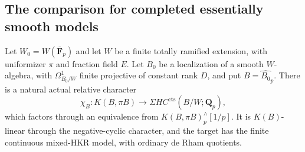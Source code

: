 \subsection{The comparison for completed essentially smooth models}

\begin{lemma}
\label{d3:lem:essentiallysmoothAMMN}
Let $W_0=W(\overline{\mathbf F}_p)$ and let $W$
be a finite totally ramified extension, with uniformizer $\pi$
and fraction field $E$. Let $B_0$ be a localization of a smooth
$W$-algebra, with $\Omega^1_{B_0/W}$ finite projective of constant
rank $D$, and put $B=\widehat{B_0}_p$.
There is a natural actual relative character
\[
 \chi_B:K(B,\pi B)\longrightarrow
                 \Sigma HC^{\mathrm{cts}}(B/W;\mathbf Q_p),
\]
which factors through an equivalence from
$K(B,\pi B)^{\wedge}_p[1/p]$. It is $K(B)$-linear through the negative-cyclic
character, and the target has the finite continuous mixed-HKR
model, with ordinary de Rham quotients.
\end{lemma}

